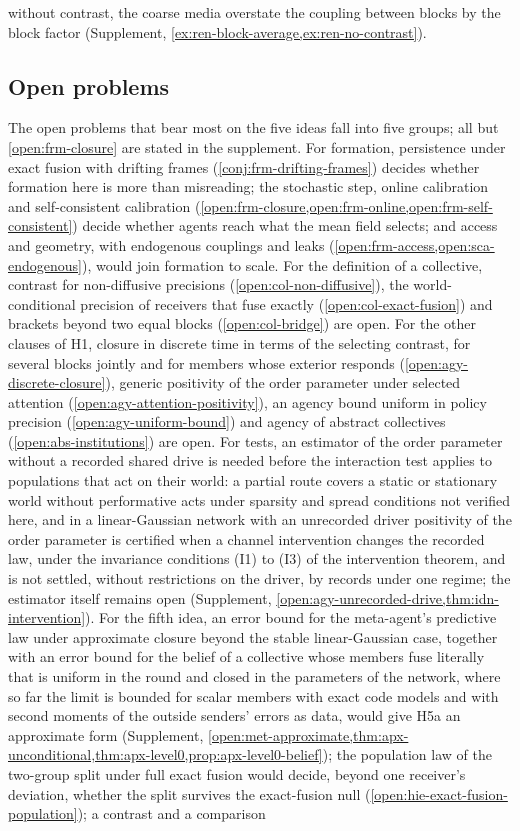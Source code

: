without contrast, the coarse media overstate the coupling between blocks by the block factor (Supplement, \cref{ex:ren-block-average,ex:ren-no-contrast}).

\subsection{Open problems}\label{sec:dis-open}

The open problems that bear most on the five ideas fall into five groups; all but \cref{open:frm-closure} are stated in the supplement. For formation, persistence under exact fusion with drifting frames (\cref{conj:frm-drifting-frames}) decides whether formation here is more than misreading; the stochastic step, online calibration and self-consistent calibration (\cref{open:frm-closure,open:frm-online,open:frm-self-consistent}) decide whether agents reach what the mean field selects; and access and geometry, with endogenous couplings and leaks (\cref{open:frm-access,open:sca-endogenous}), would join formation to scale. For the definition of a collective, contrast for non-diffusive precisions (\cref{open:col-non-diffusive}), the world-conditional precision of receivers that fuse exactly (\cref{open:col-exact-fusion}) and brackets beyond two equal blocks (\cref{open:col-bridge}) are open. For the other clauses of H1, closure in discrete time in terms of the selecting contrast, for several blocks jointly and for members whose exterior responds (\cref{open:agy-discrete-closure}), generic positivity of the order parameter under selected attention (\cref{open:agy-attention-positivity}), an agency bound uniform in policy precision (\cref{open:agy-uniform-bound}) and agency of abstract collectives (\cref{open:abs-institutions}) are open. For tests, an estimator of the order parameter without a recorded shared drive is needed before the interaction test applies to populations that act on their world: a partial route covers a static or stationary world without performative acts under sparsity and spread conditions not verified here, and in a linear-Gaussian network with an unrecorded driver positivity of the order parameter is certified when a channel intervention changes the recorded law, under the invariance conditions (I1) to (I3) of the intervention theorem, and is not settled, without restrictions on the driver, by records under one regime; the estimator itself remains open (Supplement, \cref{open:agy-unrecorded-drive,thm:idn-intervention}). For the fifth idea, an error bound for the meta-agent's predictive law under approximate closure beyond the stable linear-Gaussian case, together with an error bound for the belief of a collective whose members fuse literally that is uniform in the round and closed in the parameters of the network, where so far the limit is bounded for scalar members with exact code models and with second moments of the outside senders' errors as data, would give H5a an approximate form (Supplement, \cref{open:met-approximate,thm:apx-unconditional,thm:apx-level0,prop:apx-level0-belief}); the population law of the two-group split under full exact fusion would decide, beyond one receiver's deviation, whether the split survives the exact-fusion null (\cref{open:hie-exact-fusion-population}); a contrast and a comparison 